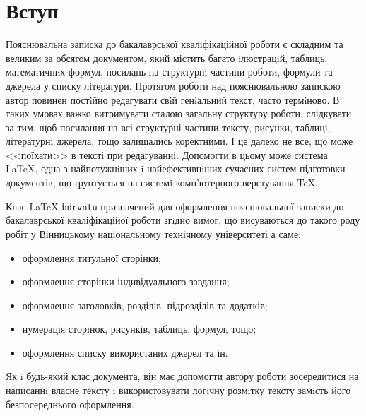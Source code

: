 \chapter*{Вступ}

Пояснювальна записка до бакалаврської кваліфікаційної роботи є складним та великим за обсягом документом, який містить
багато iлюстрацiй, таблиць, математичних формул, посилань на структурнi частини роботи, формули та джерела у списку 
лiтератури. Протягом роботи над пояснювальною запискою автор повинен постiйно редагувати свiй генiальний текст,
часто термiново. В таких умовах важко витримувати сталою загальну структуру роботи, слідкувати за тим, щоб посилання
на всі структурні частини тексту, рисунки, таблиці, літературні джерела, тощо залишались коректними. І це далеко не все,
що може <<поїхати>> в тексті при редагуванні. Допомогти в цьому може система \LaTeX, одна з найпотужнiших i найефективнiших 
сучасних систем підготовки документів, що ґрунтується на системi комп’ютерного верстування \TeX \cite{latexctan}.

Клас {\LaTeX} {\verb|bdrvntu|} призначений для оформлення пояснювальної записки до бакалаврської кваліфікаційої роботи згiдно вимог,
що висуваються до такого роду робіт у Вінницькому національному технічному університеті а саме:

\begin{itemize}
\item оформлення титульної сторінки;
\item оформлення сторінки індивідуального завдання;
\item оформлення заголовків, розділів, підрозділів та додатків;
\item нумерація сторінок, рисунків, таблиць, формул, тощо;
\item оформлення списку використаних джерел та ін.
\end{itemize} 

Як i будь-який клас документа, він має допомогти автору роботи зосередитися на написаннi власне тексту i використовувати 
логiчну розмiтку тексту замiсть його безпосереднього оформлення.
